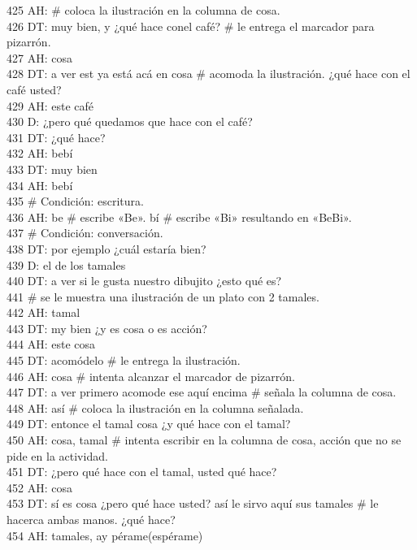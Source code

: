 425 AH: # coloca la ilustración en la columna de cosa.\\
426 DT: muy bien, y ¿qué hace conel café? # le entrega el marcador para pizarrón.\\
427 AH: cosa\\
428 DT: a ver est ya está acá en cosa # acomoda la ilustración. ¿qué hace con el café usted?\\
429 AH: este café\\
430 D: ¿pero qué quedamos que hace con el café?\\
431 DT: ¿qué hace?\\
432 AH: bebí\\
433 DT: muy bien\\
434 AH: bebí\\
435 # Condición: escritura.\\
436 AH: be # escribe «Be». bí # escribe «Bi» resultando en «BeBi».\\
437 # Condición: conversación.\\
438 DT: por ejemplo ¿cuál estaría bien?\\
439 D: el de los tamales\\
440 DT: a ver si le gusta nuestro dibujito ¿esto qué es?\\
441 # se le muestra una ilustración de un plato con 2 tamales.\\
442 AH: tamal\\
443 DT: my bien ¿y es cosa o es acción?\\
444 AH: este cosa\\
445 DT: acomódelo # le entrega la ilustración.\\
446 AH: cosa # intenta alcanzar el marcador de pizarrón.\\
447 DT: a ver primero acomode ese aquí encima # señala la columna de cosa.\\
448 AH: así # coloca la ilustración en la columna señalada.\\
449 DT: entonce el tamal cosa ¿y qué hace con el tamal?\\
450 AH: cosa, tamal # intenta escribir en la columna de cosa, acción que no se pide en la actividad.\\
451 DT: ¿pero qué hace con el tamal, usted qué hace?\\
452 AH: cosa\\
453 DT: sí es cosa ¿pero qué hace usted? así le sirvo aquí sus tamales # le hacerca ambas manos. ¿qué hace?\\
454 AH: tamales, ay pérame(espérame)\\
